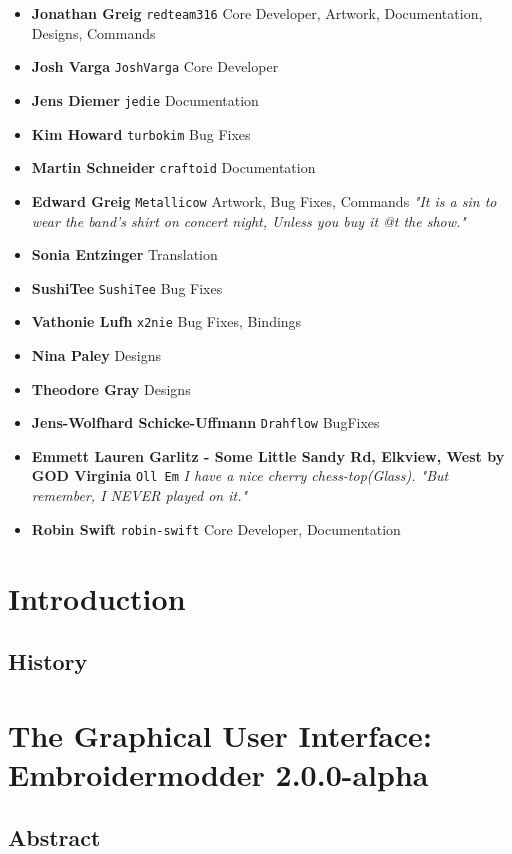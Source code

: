 \documentclass[a4paper, 11pt]{report}
\newcommand{\emversion}{2.0.0-alpha}
\begin{document}
\begin{itemize}
\item \textbf{Jonathan Greig} \texttt{redteam316} Core Developer, Artwork, Documentation, Designs, Commands
\item \textbf{Josh Varga} \texttt{JoshVarga} Core Developer
\item \textbf{Jens Diemer} \texttt{jedie} Documentation
\item \textbf{Kim Howard} \texttt{turbokim} Bug Fixes
\item \textbf{Martin Schneider} \texttt{craftoid} Documentation
\item \textbf{Edward Greig} \texttt{Metallicow} Artwork, Bug Fixes, Commands \emph{"It is a sin to wear the band's shirt on concert night, Unless you buy it @t the show."}
\item \textbf{Sonia Entzinger} Translation
\item \textbf{SushiTee} \texttt{SushiTee} Bug Fixes
\item \textbf{Vathonie Lufh} \texttt{x2nie} Bug Fixes, Bindings
\item \textbf{Nina Paley} Designs
\item \textbf{Theodore Gray} Designs
\item \textbf{Jens-Wolfhard Schicke-Uffmann} \texttt{Drahflow} BugFixes
\item \textbf{Emmett Lauren Garlitz - Some Little Sandy Rd, Elkview, West by GOD Virginia} \texttt{Oll Em} \textit{I have a nice cherry chess-top(Glass). "But remember, I NEVER played on it."}
\item \textbf{Robin Swift} \texttt{robin-swift} Core Developer, Documentation
\end{itemize}

\chapter{Introduction}

\section{History}

\chapter{The Graphical User Interface: Embroidermodder \emversion}

\section{Abstract}
\end{document}
